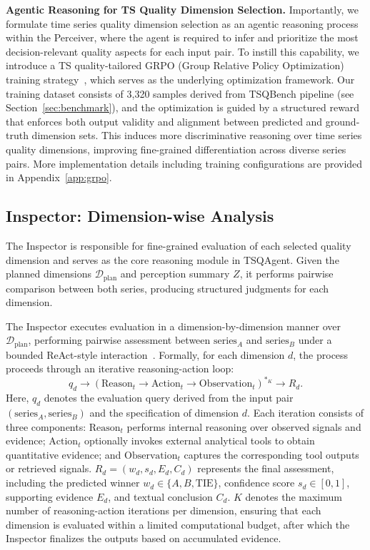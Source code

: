 \documentclass{article}
\newcommand{\partitle}[1]{\smallskip \noindent \textbf{#1.}}
\begin{document}
\partitle{Agentic Reasoning for TS Quality Dimension Selection} 
Importantly, we formulate time series quality dimension selection as an agentic reasoning process within the Perceiver, where the agent is required to infer and prioritize the most decision-relevant quality aspects for each input pair. To instill this capability, we introduce a TS quality-tailored GRPO (Group Relative Policy Optimization) training strategy~\citep{shao2024deepseekmath}, which serves as the underlying optimization framework. Our training dataset consists of 3,320 samples derived from TSQBench pipeline (see Section~\ref{sec:benchmark}), and the optimization is guided by a structured reward that enforces both output validity and alignment between predicted and ground-truth dimension sets. This induces more discriminative reasoning over time series quality dimensions, improving fine-grained differentiation across diverse series pairs. More implementation details including training configurations are provided in Appendix~\ref{app:grpo}.


\subsection{Inspector: Dimension-wise Analysis}
\label{sec:inspect}

The Inspector is responsible for fine-grained evaluation of each selected quality dimension and serves as the core reasoning module in TSQAgent. Given the planned dimensions $\mathcal{D}_{\text{plan}}$ and perception summary $Z$, it performs pairwise comparison between both series, producing structured judgments for each dimension.

The Inspector executes evaluation in a dimension-by-dimension manner over $\mathcal{D}_{\text{plan}}$, performing pairwise assessment between $\mathrm{series}_A$ and $\mathrm{series}_B$ under a bounded ReAct-style interaction~\citep{yao2023react}.
Formally, for each dimension $d$, the process proceeds through an iterative reasoning-action loop:
\begin{equation}
q_d \rightarrow (\text{Reason}_t \rightarrow \text{Action}_t \rightarrow \text{Observation}_t)^{*_{K}} \rightarrow R_d.
\end{equation}
Here, $q_d$ denotes the evaluation query derived from the input pair $(\mathrm{series}_A, \mathrm{series}_B)$ and the specification of dimension $d$. Each iteration consists of three components: $\text{Reason}_t$ performs internal reasoning over observed signals and evidence; $\text{Action}_t$ optionally invokes external analytical tools to obtain quantitative evidence; and $\text{Observation}_t$ captures the corresponding tool outputs or retrieved signals.
$R_d = (w_d, s_d, E_d, C_d)$ represents the final assessment, including the predicted winner $w_d \in \{A, B, \text{TIE}\}$, confidence score $s_d \in [0,1]$, supporting evidence $E_d$, and textual conclusion $C_d$.
$K$ denotes the maximum number of reasoning-action iterations per dimension, ensuring that each dimension is evaluated within a limited computational budget, after which the Inspector finalizes the outputs based on accumulated evidence.
\end{document}
